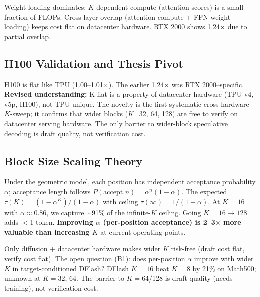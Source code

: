 \documentclass[12pt,letterpaper]{article}
\begin{document}
\begin{table}[htbp]
\caption{K=128 vs.\ K=16 full forward pass ratio across hardware. Datacenter accelerators are flat; RTX 2000 (workstation) shows 1.24$\times$.}
\label{tab:kflat}
\resizebox{0.85\linewidth}{!}{}
\end{table}

Weight loading dominates; $K$-dependent compute (attention scores) is a small fraction of FLOPs. Cross-layer overlap (attention compute + FFN weight loading) keeps cost flat on datacenter hardware. RTX 2000 shows 1.24$\times$ due to partial overlap.

\subsection{H100 Validation and Thesis Pivot}

H100 is flat like TPU (1.00--1.01$\times$). The earlier 1.24$\times$ was RTX 2000--specific. \textbf{Revised understanding:} K-flat is a property of datacenter hardware (TPU v4, v5p, H100), not TPU-unique. The novelty is the first systematic cross-hardware $K$-sweep; it confirms that wider blocks ($K$=32, 64, 128) are free to verify on datacenter serving hardware. The only barrier to wider-block speculative decoding is draft quality, not verification cost.

\subsection{Block Size Scaling Theory}

Under the geometric model, each position has independent acceptance probability $\alpha$; acceptance length follows $P(\text{accept } n) = \alpha^n (1-\alpha)$. The expected $\tau(K) = (1 - \alpha^K)/(1-\alpha)$ with ceiling $\tau(\infty) = 1/(1-\alpha)$. At $K=16$ with $\alpha \approx 0.86$, we capture $\sim$91\% of the infinite-$K$ ceiling. Going $K=16 \to 128$ adds $<$1 token. \textbf{Improving $\alpha$ (per-position acceptance) is 2--3$\times$ more valuable than increasing $K$} at current operating points.

Only diffusion + datacenter hardware makes wider $K$ risk-free (draft cost flat, verify cost flat). The open question (B1): does per-position $\alpha$ improve with wider $K$ in target-conditioned DFlash? DFlash $K=16$ beat $K=8$ by 21\% on Math500; unknown at $K=32$, 64. The barrier to $K=64$/128 is draft quality (needs training), not verification cost.
\end{document}
